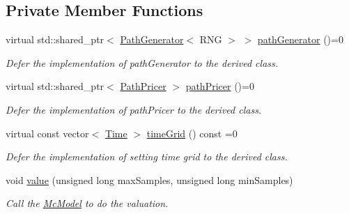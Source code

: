 \subsection*{Private Member Functions}
\begin{DoxyCompactItemize}
\item 
virtual std\+::shared\+\_\+ptr$<$ \hyperlink{class_path_generator}{Path\+Generator}$<$ R\+NG $>$ $>$ \hyperlink{class_mc_simulation_a44086a1efd452d8644c9f2e52417038f}{path\+Generator} ()=0
\begin{DoxyCompactList}\small\item\em Defer the implementation of path\+Generator to the derived class. \end{DoxyCompactList}\item 
virtual std\+::shared\+\_\+ptr$<$ \hyperlink{class_path_pricer}{Path\+Pricer} $>$ \hyperlink{class_mc_simulation_ae3b894a78823df7897abf418bb04a4a1}{path\+Pricer} ()=0
\begin{DoxyCompactList}\small\item\em Defer the implementation of path\+Pricer to the derived class. \end{DoxyCompactList}\item 
virtual const vector$<$ \hyperlink{_name_def_8h_ac2d3e0ba793497bcca555c7c2cf64ff3}{Time} $>$ \hyperlink{class_mc_simulation_a8af54a9121f2d875872295b03a1b2a40}{time\+Grid} () const =0
\begin{DoxyCompactList}\small\item\em Defer the implementation of setting time grid to the derived class. \end{DoxyCompactList}\item 
void \hyperlink{class_mc_simulation_a476b6d633c6ebb742d6d26a62a6a3810}{value} (unsigned long max\+Samples, unsigned long min\+Samples)
\begin{DoxyCompactList}\small\item\em Call the \hyperlink{class_mc_model}{Mc\+Model} to do the valuation. \end{DoxyCompactList}\end{DoxyCompactItemize}
